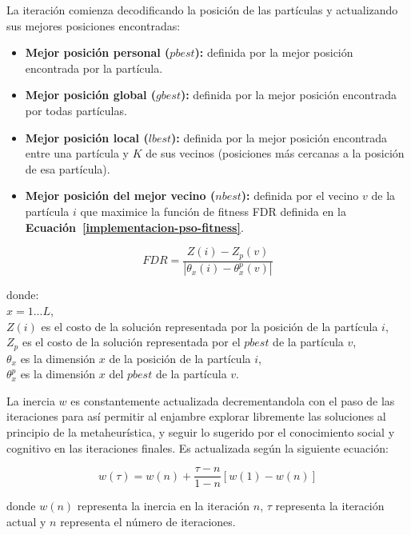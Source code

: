 La iteración comienza decodificando la posición de las partículas y actualizando sus mejores posiciones en\-con\-tra\-das: 
\begin{itemize}
\item \textbf{Mejor posición personal ($pbest$):} definida por la mejor posición encontrada por la partícula.
\item \textbf{Mejor posición global ($gbest$): } definida por la mejor posición encontrada por todas partículas.
\item \textbf{Mejor posición local ($lbest$): } definida por la mejor posición encontrada entre una partícula y $K$ de sus vecinos (posiciones más cercanas a la posición de esa partícula).
\item \textbf{Mejor posición del mejor vecino ($nbest$): } definida por el vecino $v$ de la partícula $i$ que maximice la función de fitness FDR definida en la \textbf{Ecuación~\ref{implementacion-pso-fitness}}.
\end{itemize}

\begin{equation}\label{implementacion-pso-fitness}
FDR = \frac{Z(i) - Z_p(v)}{|\theta_x(i) - \theta_x^p(v)|}
\end{equation}


donde:\\
$x = 1 ... L$,\\
$Z(i)$ es el costo de la solución representada por la posición de la partícula $i$,\\
$Z_p$ es el costo de la solución representada por el  $pbest$ de la partícula $v$,\\
$\theta_x$ es la dimensión $x$ de la posición de la partícula $i$,\\
$\theta_x^p$ es la dimensión $x$ del $pbest$ de la partícula $v$.

La inercia $w$ es constantemente actualizada decrementandola con el paso de las iteraciones para así permitir al enjambre explorar libremente las soluciones al principio de la metaheurística, y seguir lo sugerido por el conocimiento social y cognitivo en las iteraciones finales. Es actualizada según la siguiente ecuación:

\begin{equation}
w(\tau) = w(n) + \frac{\tau - n}{1 - n}[w(1) - w(n)]
\end{equation}

donde $w(n)$ representa la inercia en la iteración $n$, $\tau$ representa la iteración actual y $n$ representa el número de iteraciones.

